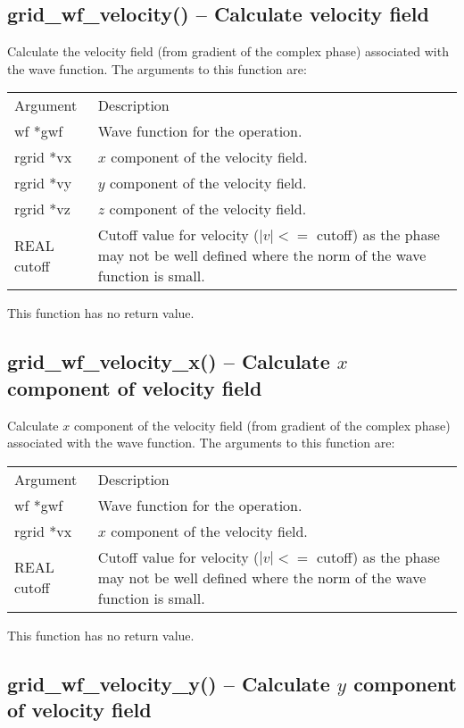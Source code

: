 \documentclass[12pt,letterpaper]{report}
\begin{document}
\subsection{grid\_wf\_velocity() -- Calculate velocity field}

Calculate the velocity field (from gradient of the complex phase) associated with the wave function. The arguments to this function are:
\begin{longtable}{p{} p{}}
Argument & Description\\
\cline{1-2}
wf *gwf & Wave function for the operation.\\
rgrid *vx & $x$ component of the velocity field.\\
rgrid *vy & $y$ component of the velocity field.\\
rgrid *vz & $z$ component of the velocity field.\\
REAL cutoff & Cutoff value for velocity ($|v| <=$ cutoff) as the phase may not be well defined where the norm of the wave function is small.\\
\end{longtable}
\noindent
This function has no return value.

\subsection{grid\_wf\_velocity\_x() -- Calculate $x$ component of velocity field}

Calculate $x$ component of the velocity field (from gradient of the complex phase) associated with the wave function. The arguments to this function are:
\begin{longtable}{p{} p{}}
Argument & Description\\
\cline{1-2}
wf *gwf & Wave function for the operation.\\
rgrid *vx & $x$ component of the velocity field.\\
REAL cutoff & Cutoff value for velocity ($|v| <=$ cutoff) as the phase may not be well defined where the norm of the wave function is small.\\
\end{longtable}
\noindent
This function has no return value.

\subsection{grid\_wf\_velocity\_y() -- Calculate $y$ component of velocity field}
\end{document}
